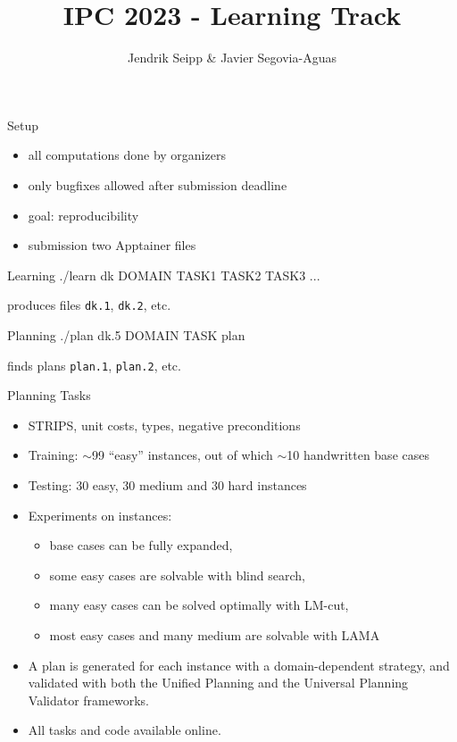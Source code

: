 \documentclass[aspectratio=169,xcolor=dvipsnames]{beamer}
\title[short title]{IPC 2023 - Learning Track} %
\author[Allauthors] {Jendrik Seipp \& Javier Segovia-Aguas}
\date{} %
\begin{document}
\begin{frame}
    \titlepage
\end{frame}

\begin{frame}{Setup}
    \begin{itemize}
        \item all computations done by organizers
        \item only bugfixes allowed after submission deadline
        \item goal: reproducibility
        \item submission two Apptainer files
    \end{itemize}

    \begin{block}{Learning}
        ./learn dk DOMAIN TASK1 TASK2 TASK3 ...
    \end{block}

    produces files \texttt{dk.1}, \texttt{dk.2}, etc.

    \begin{exampleblock}{Planning}
        ./plan dk.5 DOMAIN TASK plan
    \end{exampleblock}

    finds plans \texttt{plan.1}, \texttt{plan.2}, etc.
\end{frame}

\begin{frame}{Planning Tasks}
    \begin{itemize}
        \item STRIPS, unit costs, types, negative preconditions
        \item Training: $\sim$99 ``easy'' instances, out of which $\sim$10 handwritten base cases
        \item Testing: 30 easy, 30 medium and 30 hard instances
        \item Experiments on instances:
        \begin{itemize}
            \item base cases can be fully expanded,
            \item some easy cases are solvable with blind search,
            \item many easy cases can be solved optimally with LM-cut,
            \item most easy cases and many medium are solvable with LAMA
        \end{itemize}
        \item A plan is generated for each instance with a domain-dependent strategy, and validated with both the Unified Planning and the Universal Planning Validator frameworks.
        \item All tasks and code available online.
    \end{itemize}
\end{frame}
\end{document}
